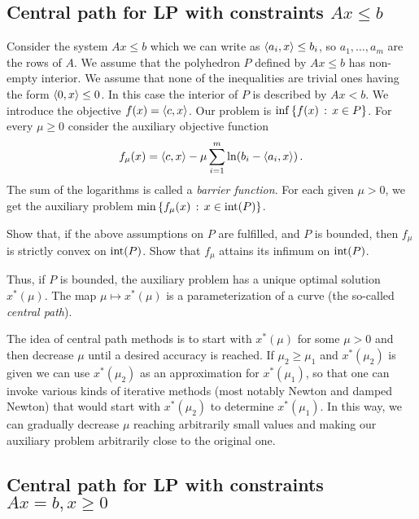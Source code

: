 \subsection{Central path for LP with constraints \texorpdfstring{$Ax \le b$}{Ax <= b}}

Consider the system $A x \le b$ which we can write as $\left\langle a_i , x \right\rangle \le b_i$, so $a_1,\ldots,a_m$ are the rows of $A$. We assume that the polyhedron $P$ defined by $A x \le b$ has non-empty interior. We assume that none of the inequalities are trivial ones having the form $\left\langle 0 , x \right\rangle \le 0$. In this case the interior of $P$ is described by $A x < b$. We introduce the objective $f(x) = \left\langle c , x \right\rangle$. Our problem is $\inf \left\{ f(x) \,:\, x \in P \right\}$. For every $\mu \ge 0$ consider the auxiliary objective function 
\[
	f_\mu(x) = \left\langle c , x \right\rangle - \mu \sum_{i=1}^m \ln(b_i- \left\langle a_i , x \right\rangle) \,.
\]
The sum of the logarithms is called a \emph{barrier function}. For each given $\mu> 0$, we get the auxiliary problem $\min \left\{ f_\mu(x) \,:\, x \in \operatorname{int}(P) \right\}$. 

\begin{exercise}
	Show that, if the above assumptions on $P$ are fulfilled, and $P$ is bounded, then $f_\mu$ is strictly convex on $\operatorname{int}(P)$. Show that $f_\mu$ attains its infimum on $\operatorname{int}(P)$. 
\end{exercise}

Thus, if $P$ is bounded, the auxiliary problem has a unique optimal solution $x^\ast(\mu)$. The map $\mu \mapsto x^\ast(\mu)$ is a parameterization of a curve (the so-called \emph{central path}). 

The idea of central path methods is to start with $x^\ast(\mu)$ for some $\mu>0$ and then decrease $\mu$ until a desired accuracy is reached. If $\mu_2 \ge \mu_1$ and $x^\ast(\mu_2)$ is given we can use $x^\ast(\mu_2)$ as an approximation for $x^\ast(\mu_1)$, so that one can invoke various kinds of iterative methods (most notably Newton and damped Newton) that would start with $x^\ast(\mu_2)$ to determine $x^\ast(\mu_1)$. In this way, we can gradually decrease $\mu$ reaching arbitrarily small values and making our auxiliary problem arbitrarily close to the original one.

\subsection{Central path for LP with constraints \texorpdfstring{$Ax=b, x \ge 0$}{Ax = b, x >= 0}}
\label{sect:central-path-LP}

